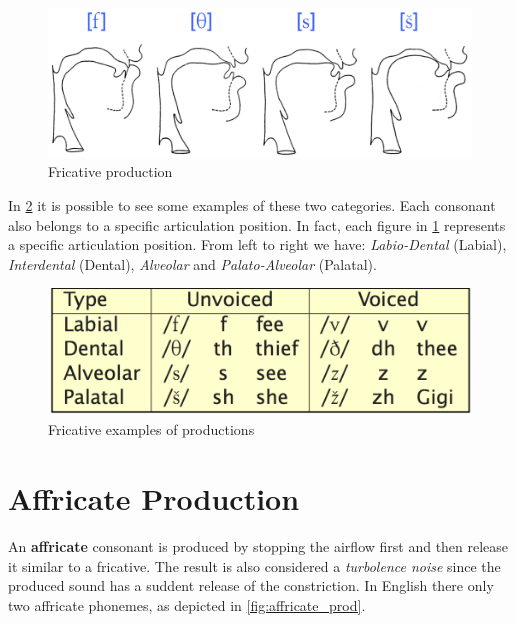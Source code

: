 \begin{figure}[!ht]
    \centering
    \includegraphics[scale=0.5]{Figures/fricative_production.png}
    \caption{Fricative production \cite{mit_phonetics}}
    \label{fig:fricative_prod}
\end{figure}

\noindent In \ref{fig:fricative_ex} it is possible to see some examples of these two categories. Each consonant also belongs to a specific articulation position. In fact, each figure in \ref{fig:fricative_prod} represents a specific articulation position. From left to right we have: \textit{Labio-Dental} (Labial), \textit{Interdental} (Dental), \textit{Alveolar} and \textit{Palato-Alveolar} (Palatal).

\begin{figure}[!ht]
    \centering
    \includegraphics[scale=0.5]{Figures/fricative_examples.png}
    \caption{Fricative examples of productions \cite{mit_phonetics}}
    \label{fig:fricative_ex}
\end{figure}


\section{Affricate Production}
\label{sec:Affricate Production}
An \textbf{affricate} consonant is produced by stopping the airflow first and then release it similar to a fricative. The result is also considered a \textit{turbolence noise} since the produced sound has a suddent release of the constriction. In English there only two affricate phonemes, as depicted in \ref{fig:affricate_prod}.

